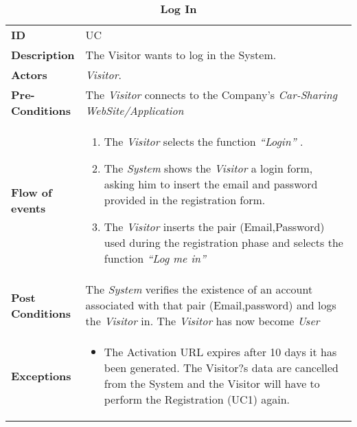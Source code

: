 \begin{longtable}{|p{0.2\linewidth} p{0.8\linewidth}|}
	\captionsetup{labelformat=empty} %
	\caption{\textbf{Log In}} %
	\label{UC_Login}%
	\\ \hline %
	
	\textbf{ID} & UC\theUseCaseIdCounter \\ \hline
	\textbf{Description} & The Visitor wants to log in the System. \\ \hline
	\textbf{Actors} & \emph{Visitor}.\\ \hline
	\textbf{Pre-Conditions} & The \emph{Visitor} connects to the Company's \emph{Car-Sharing WebSite/Application} \\ \hline
	\textbf{Flow of events} & 
	\begin{enumerate}
		\item The \emph{Visitor} selects the function \textit{\textquotedblleft{Login}\textquotedblright} .
		\item The \emph{System} shows the \emph{Visitor} a login form, asking him to insert the email and password provided in the registration form.
		\item The \emph{Visitor} inserts the pair (Email,Password) used during the registration phase and selects the function \textit{\textquotedblleft{Log me in}\textquotedblright}
	\end{enumerate}	 \\ \hline
	\textbf{Post Conditions} & The \emph{System} verifies the existence of an account associated with that pair (Email,password) and logs the \emph{Visitor} in. The \emph{Visitor} has now become \emph{User}  \\ \hline
	\textbf{Exceptions} & 
	\begin{itemize}
		\item The Activation URL expires after 10 days it has been generated. The Visitor?s data are cancelled from the System and the Visitor will have to perform the Registration (UC1) again.
	\end{itemize} \\ \hline
\end{longtable}

